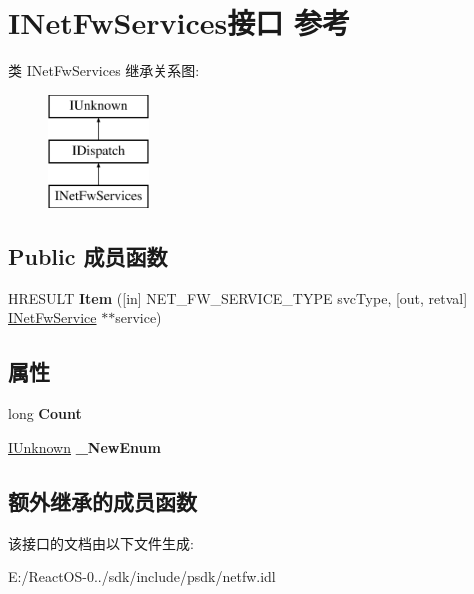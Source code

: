 \hypertarget{interface_i_net_fw_services}{}\section{I\+Net\+Fw\+Services接口 参考}
\label{interface_i_net_fw_services}
类 I\+Net\+Fw\+Services 继承关系图\+:\begin{figure}[H]
\begin{center}
\leavevmode
\includegraphics[height=3.000000cm]{interface_i_net_fw_services}
\end{center}
\end{figure}
\subsection*{Public 成员函数}
\begin{DoxyCompactItemize}
\item 
\mbox{\label{interface_i_net_fw_services_a8c5fbd125ff6d810fdace3ee2a8a8650}} 
H\+R\+E\+S\+U\+LT {\bfseries Item} (\mbox{[}in\mbox{]} N\+E\+T\+\_\+\+F\+W\+\_\+\+S\+E\+R\+V\+I\+C\+E\+\_\+\+T\+Y\+PE svc\+Type, \mbox{[}out, retval\mbox{]} \hyperlink{interface_i_net_fw_service}{I\+Net\+Fw\+Service} $\ast$$\ast$service)
\end{DoxyCompactItemize}
\subsection*{属性}
\begin{DoxyCompactItemize}
\item 
\mbox{\label{interface_i_net_fw_services_a4eea7dfcf7daf563f54ac2c043c201d2}} 
long {\bfseries Count}
\item 
\mbox{\label{interface_i_net_fw_services_ac679ee0aa565215eea506e0ee2231868}} 
\hyperlink{interface_i_unknown}{I\+Unknown} {\bfseries \+\_\+\+New\+Enum}
\end{DoxyCompactItemize}
\subsection*{额外继承的成员函数}


该接口的文档由以下文件生成\+:\begin{DoxyCompactItemize}
\item 
E\+:/\+React\+O\+S-\/0../sdk/include/psdk/netfw.\+idl\end{DoxyCompactItemize}

